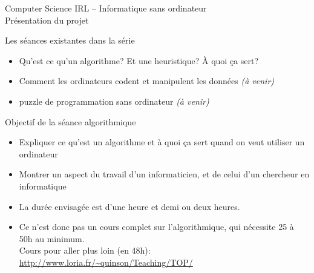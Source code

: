 \documentclass[final,hyperref={pdfpagelabels=false}]{beamer}
\renewenvironment{Coupe}{   }{   }
\renewcommand*{\large}{\fontsize{\resultlargeX}{\resultlargeY}\selectfont}
\begin{document}
\begin{Coupe}
\begin{frame}{Computer Science IRL -- Informatique sans ordinateur\\[-5pt]
  {\large Présentation du projet}}
  \begin{block}{Les séances existantes dans la série}
    \begin{itemize}
    \item {} Qu'est ce qu'un algorithme? Et une
      heuristique? À quoi ça sert?
    \item {} Comment les ordinateurs codent
      et manipulent les données \textit{(à venir)}
    \item {} puzzle de programmation sans ordinateur 
      \textit{(à venir)}
    \end{itemize}
  \end{block}
  \vspace{2\baselineskip}

  \begin{block}{Objectif de la séance algorithmique}
    \begin{itemize}
    \item Expliquer ce qu'est un algorithme et à quoi ça sert quand on veut
      utiliser un ordinateur
    \item Montrer un aspect du travail d'un informaticien, et de celui d'un
      chercheur en informatique
    \item La durée envisagée est d'une heure et demi ou deux heures.
    \item Ce n'est donc pas un cours complet sur l'algorithmique, qui nécessite
      25 à 50h au minimum.\\
      Cours pour aller plus loin (en 48h):
      \url{http://www.loria.fr/~quinson/Teaching/TOP/}
    \end{itemize}
  \end{block}


\end{frame}
\end{Coupe}
\end{document}
